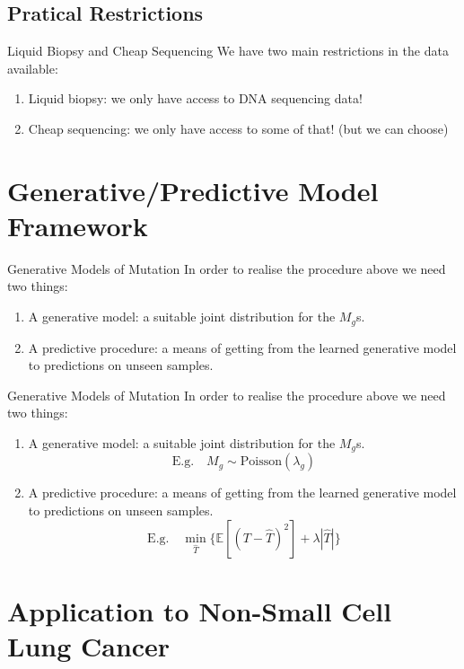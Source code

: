 \documentclass{beamer}
\begin{document}
\subsection{Pratical Restrictions}

\begin{frame}{Liquid Biopsy and Cheap Sequencing}
We have two main restrictions in the data available:
\begin{enumerate}[I]
    \item Liquid biopsy: we only have access to DNA sequencing data!
    \item Cheap sequencing: we only have access to some of that! (but we can choose)
\end{enumerate}
\end{frame}


\section{Generative/Predictive Model Framework}
\begin{frame}{Generative Models of Mutation}
In order to realise the procedure above we need two things:
\begin{enumerate}[I]
    \item A generative model: a suitable joint distribution for the $M_g$s. 
    \item A predictive procedure: a means of getting from the learned generative model to predictions on unseen samples.  
\end{enumerate}

\end{frame}

\begin{frame}{Generative Models of Mutation}
In order to realise the procedure above we need two things:
\begin{enumerate}[I]
    \item A generative model: a suitable joint distribution for the $M_g$s. 
    \[\mathrm{E.g.} \quad M_g \sim \mathrm{Poisson}(\lambda_g)\]
    \item A predictive procedure: a means of getting from the learned generative model to predictions on unseen samples.
    \[\mathrm{E.g.} \quad \min_{\hat{T}}\{\mathbb{E}[(T-\hat{T})^2] + \lambda|\hat{T}|\}\]
\end{enumerate}

\end{frame}

\section{Application to Non-Small Cell Lung Cancer}
\end{document}
